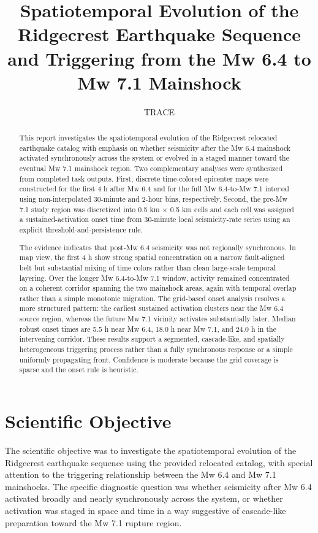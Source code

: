 \documentclass[11pt]{article}
\title{Spatiotemporal Evolution of the Ridgecrest Earthquake Sequence and Triggering from the Mw 6.4 to Mw 7.1 Mainshock}
\author{TRACE}
\date{}
\begin{document}
\maketitle

\begin{abstract}
This report investigates the spatiotemporal evolution of the Ridgecrest relocated earthquake catalog with emphasis on whether seismicity after the Mw 6.4 mainshock activated synchronously across the system or evolved in a staged manner toward the eventual Mw 7.1 mainshock region. Two complementary analyses were synthesized from completed task outputs. First, discrete time-colored epicenter maps were constructed for the first 4 h after Mw 6.4 and for the full Mw 6.4-to-Mw 7.1 interval using non-interpolated 30-minute and 2-hour bins, respectively. Second, the pre-Mw 7.1 study region was discretized into 0.5 km $\times$ 0.5 km cells and each cell was assigned a sustained-activation onset time from 30-minute local seismicity-rate series using an explicit threshold-and-persistence rule.

The evidence indicates that post-Mw 6.4 seismicity was not regionally synchronous. In map view, the first 4 h show strong spatial concentration on a narrow fault-aligned belt but substantial mixing of time colors rather than clean large-scale temporal layering. Over the longer Mw 6.4-to-Mw 7.1 window, activity remained concentrated on a coherent corridor spanning the two mainshock areas, again with temporal overlap rather than a simple monotonic migration. The grid-based onset analysis resolves a more structured pattern: the earliest sustained activation clusters near the Mw 6.4 source region, whereas the future Mw 7.1 vicinity activates substantially later. Median robust onset times are 5.5 h near Mw 6.4, 18.0 h near Mw 7.1, and 24.0 h in the intervening corridor. These results support a segmented, cascade-like, and spatially heterogeneous triggering process rather than a fully synchronous response or a simple uniformly propagating front. Confidence is moderate because the grid coverage is sparse and the onset rule is heuristic.
\end{abstract}

\section{Scientific Objective}
The scientific objective was to investigate the spatiotemporal evolution of the Ridgecrest earthquake sequence using the provided relocated catalog, with special attention to the triggering relationship between the Mw 6.4 and Mw 7.1 mainshocks. The specific diagnostic question was whether seismicity after Mw 6.4 activated broadly and nearly synchronously across the system, or whether activation was staged in space and time in a way suggestive of cascade-like preparation toward the Mw 7.1 rupture region.
\end{document}
